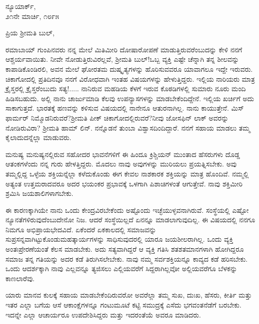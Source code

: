 \begin{flushright}
ನ್ಯೂಯಾರ್ಕ್,\\೨೧ನೇ ಮಾರ್ಚಿ, ೧೮೯೫
\end{flushright}

\vspace{-0.5cm}

\noindent
ಪ್ರಿಯ ಶ‍್ರೀಮತಿ ಬುಲ್,

ರಮಾಬಾಯ್ ಗುಂಪಿನವರು ನನ್ನ ಮೇಲೆ ಮಿತಿಮೀರಿ ದೋಷಾರೋಪಣೆ ಮಾಡುತ್ತಿರುವರೆಂಬುದನ್ನು ಕೇಳಿ ನನಗೆ ಆಶ್ಚರ್ಯವಾಯಿತು. ನೀವೇ ನೋಡುತ್ತಿರುವಿರಲ್ಲವೆ, ಶ‍್ರೀಮತಿ ಬುಲ್!ಒಬ್ಬ ವ್ಯಕ್ತಿ ಎಷ್ಟೇ ಚೆನ್ನಾಗಿ ತನ್ನ ಶೀಲವನ್ನು ಕಾಪಾಡಿಕೊಂಡಿರಲಿ, ಅವನ ಮೇಲೆ ಘೋರತಮ ದುಷ್ಕೃತ್ಯಗಳನ್ನು ಹೊರಿಸುವವರೂ ಯಾವಾಗಲೂ ಇದ್ದೇ ಇರುವರು. ಚಿಕಾಗೋದಲ್ಲಿ ಪ್ರತಿದಿನವೂ ನನಗೆ ವಿರೋಧವಾಗಿ ಇಂತಹ ವಿಷಯಗಳನ್ನು ಹೇಳುತ್ತಿದ್ದರು. ಇಲ್ಲಿಯ ನಾರಿಯರು ಮಾತ್ರ ಕ್ರೈಸ್ತರಲ್ಲಿ ಕ್ರೈಸ್ತರೆಂಬುದು ಸತ್ಯ!..... ನಾನಿರುವ ಮಹಡಿಯ ಕೆಳಗೆ ಇರುವ ಕೊಠಡಿಗಳಲ್ಲಿ ಸುಮಾರು ನೂರು ಮಂದಿ ಹಿಡಿಸಬಹುದು. ಅಲ್ಲಿ ನಾನು ಚಾರ್ಜುಮಾಡಿ ಕೆಲವು ಉಪನ್ಯಾಸಗಳನ್ನು ಮಾಡಬೇಕೆಂದಿದ್ದೇನೆ. ಇಲ್ಲಿಯ ಖರ್ಚಿಗೆ ಅದು ಸಾಕಾಗುತ್ತದೆ. ಭಾರತಕ್ಕೆ ಹಣವನ್ನು ಕಳಿಸುವ ವಿಷಯದಲ್ಲಿ ನಾನೇನೂ ಆತುರನಾಗಿಲ್ಲ. ನಾನು ಕಾಯುತ್ತೇನೆ. ಮಿಸ್ ಫಾರ್ಮರ್ ನಿಮ್ಮೊಡನಿರುವರೆ?ಶ‍್ರೀಮತಿ ಪೀಕ್ ಚಿಕಾಗೋದಲ್ಲಿರುವರೆ?ನೀವು ಜೋಸಫಿನ್ ಲಾಕ್ ಅವರನ್ನು ನೋಡಿರುವಿರಾ? ಶ‍್ರೀಮತಿ ಹಾಮ್ ಲಿನ್. ನನ್ನೊಡನೆ ತುಂಬಾ ವಿಶ್ವಾಸದಿಂದಿದ್ದಾರೆ. ನನಗೆ ಸಹಾಯ ಮಾಡಲು ತಮ್ಮ ಕೈಲಾದುದನ್ನೆಲ್ಲಾ ಮಾಡುವರು.

ಮನುಷ್ಯ ಮನುಷ್ಯನಲ್ಲಿರುವ ಸಹೋದರ ಭಾವನೆಗಳಿಗೆ ಈ ಹಿಂದೂ ಕ್ರಿಶ್ಚಿಯನ್ ಮುಂತಾದ ಹೆಸರುಗಳು ದೊಡ್ಡ ಆತಂಕಗಳೆಂದು ನನ್ನ ಗುರು ಹೇಳತ್ತಿದ್ದರು. ಮೊದಲು ನಾವು ಅವುಗಳನ್ನು ಮುರಿಯಲು ಪ್ರಯತ್ನಿಸಬೇಕು. ಅವು ತಮ್ಮಲ್ಲಿದ್ದ ಒಳ್ಳೆಯ ಶಕ್ತಿಯನ್ನೆಲ್ಲಾ ಕಳೆದುಕೊಂಡು ಈಗ ಕೇವಲ ನಾಶಕಾರಕ ಶಕ್ತಿಯನ್ನು ಮಾತ್ರ ಹೊಂದಿವೆ. ನಮ್ಮಲ್ಲಿ ಅತ್ಯಂತ ಉತ್ತಮರಾದವರೂ ಅದರ ಭಯಂಕರ ಪ್ರಭಾವಕ್ಕೆ ಒಳಗಾಗಿ ಪಿಶಾಚಿಗಳಂತೆ ಆಗುತ್ತೇವೆ. ನಾವು ಶಕ್ತಿಮೀರಿ ಶ್ರಮಿಸಿ ಜಯಶಾಲಿಗಳಾಗಬೇಕು.

ಈ ಕಾರಣಕ್ಕಾಗಿಯೇ ನಾನು ಒಂದು ಕೇಂದ್ರವಿರಬೇಕೆಂದು ಅಷ್ಟೊಂದು ಇಚ್ಛೆಯುಳ್ಳವನಾಗಿರುವೆ. ಸಂಸ್ಥೆಯಲ್ಲಿ ಎಷ್ಟೋ ನ್ಯೂನತೆಗಳಿರುವುದೆಂಬುದೇನೋ ನಿಜ. ಆದರೆ ಸಂಸ್ಥೆಯಿಲ್ಲದೆ ಏನನ್ನೂ ಮಾಡಲಾಗುವುದಿಲ್ಲ. ಈ ವಿಷಯದಲ್ಲಿ ನನಗೂ ನಿಮಗೂ ಅಭಿಪ್ರಾಯಭೇದವಿದೆ. ಏಕೆಂದರೆ ಏಕಕಾಲದಲ್ಲಿ ಸಮಾಜವನ್ನು ಸುಪ್ರಸನ್ನವಾಗಿಟ್ಟುಕೊಂಡು\break ಮಹತ್ಕಾರ್ಯಗಳನ್ನು ಸಾಧಿಸುವುದರಲ್ಲಿ ಯಾರೂ ಜಯಶೀಲರಾಗಿಲ್ಲ. ಒಂದು ವ್ಯಕ್ತಿ ಅಂತಃಪ್ರೇರಣೆಯಂತೆ ಕೆಲಸ ಮಾಡಬೇಕು. ಅದು ಸತ್ಯವಾಗಿದ್ದರೆ ಆ ವ್ಯಕ್ತಿ ಗತಿಸಿ ಶತಶತಮಾನಗಳಾಗಿ ಹೋಗಿದ್ದರೂ ಸಮಾಜ ತನ್ನ ಗತಿಯನ್ನು ಅದರ ಕಡೆ ತಿರುಗಿಸಲೇಬೇಕು. ನಾವು ನಮ್ಮ ಸರ್ವಶಕ್ತಿಯನ್ನೂ ಕಾವ್ಯದ ಕಡೆ ಹರಿಸಬೇಕು. ಒಂದು ಆದರ್ಶಕ್ಕಾಗಿ ನಾವು ಎಲ್ಲವನ್ನೂ ತ್ಯಜಿಸಲು ಎಲ್ಲಿಯವರೆಗೆ ಸಿದ್ದರಾಗಿಲ್ಲವೋ ಅಲ್ಲಿಯವರೆಗೂ ಬೆಳಕನ್ನು ಕಾಣಲಾರೆವು.

ಯಾರು ಮಾನವ ಕುಲಕ್ಕೆ ಸಹಾಯ ಮಾಡಬೇಕೆಂದಿರುವರೋ ಅವರೆಲ್ಲಾ ತಮ್ಮ ಸುಖ, ದುಃಖ, ಹೆಸರು, ಕೀರ್ತಿ ಮತ್ತು ಇತರ ಎಲ್ಲಾ ಬಗೆಯ ಆಸೆ ಆಕಾಂಕ್ಷೆಗಳನ್ನೂ ಗಂಟುಮೂಟೆ ಕಟ್ಟಿ ಸಮುದ್ರಕ್ಕೆ ಎಸೆದು ಭಗವಂತನೆಡೆಗೆ ಬರಬೇಕು. ಇದನ್ನೇ ಎಲ್ಲಾ ಆಚಾರ್ಯರೂ ಉಪದೇಶಿಸಿದ್ದರು ಮತ್ತು ಇದರಂತೆಯೆ ಅವರೂ ಮಾಡಿದರು.

\eject

